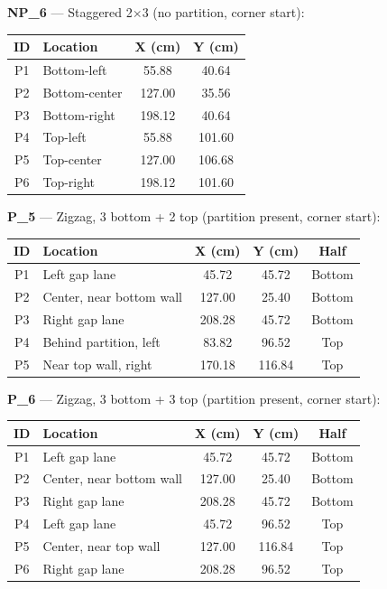 \documentclass[a4]{article}
\begin{document}
\textbf{NP\_6} --- Staggered 2$\times$3 (no partition, corner start):

\begin{table}[H]
\centering
\begin{tabular}{clcc}
\toprule
\textbf{ID} & \textbf{Location} & \textbf{X (cm)} & \textbf{Y (cm)} \\
\midrule
P1 & Bottom-left & 55.88 & 40.64 \\
P2 & Bottom-center & 127.00 & 35.56 \\
P3 & Bottom-right & 198.12 & 40.64 \\
P4 & Top-left & 55.88 & 101.60 \\
P5 & Top-center & 127.00 & 106.68 \\
P6 & Top-right & 198.12 & 101.60 \\
\bottomrule
\end{tabular}
\end{table}

\textbf{P\_5} --- Zigzag, 3 bottom + 2 top (partition present, corner start):

\begin{table}[H]
\centering
\begin{tabular}{clccc}
\toprule
\textbf{ID} & \textbf{Location} & \textbf{X (cm)} & \textbf{Y (cm)} & \textbf{Half} \\
\midrule
P1 & Left gap lane & 45.72 & 45.72 & Bottom \\
P2 & Center, near bottom wall & 127.00 & 25.40 & Bottom \\
P3 & Right gap lane & 208.28 & 45.72 & Bottom \\
P4 & Behind partition, left & 83.82 & 96.52 & Top \\
P5 & Near top wall, right & 170.18 & 116.84 & Top \\
\bottomrule
\end{tabular}
\end{table}

\textbf{P\_6} --- Zigzag, 3 bottom + 3 top (partition present, corner start):

\begin{table}[H]
\centering
\begin{tabular}{clccc}
\toprule
\textbf{ID} & \textbf{Location} & \textbf{X (cm)} & \textbf{Y (cm)} & \textbf{Half} \\
\midrule
P1 & Left gap lane & 45.72 & 45.72 & Bottom \\
P2 & Center, near bottom wall & 127.00 & 25.40 & Bottom \\
P3 & Right gap lane & 208.28 & 45.72 & Bottom \\
P4 & Left gap lane & 45.72 & 96.52 & Top \\
P5 & Center, near top wall & 127.00 & 116.84 & Top \\
P6 & Right gap lane & 208.28 & 96.52 & Top \\
\bottomrule
\end{tabular}
\end{table}
\end{document}
